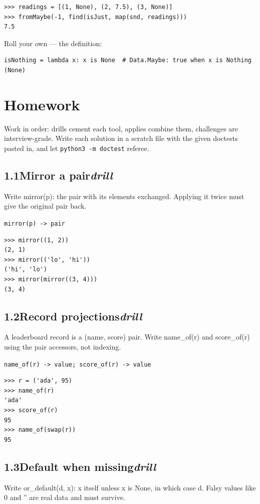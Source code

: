 \documentclass[10pt,letterpaper]{book}
\begin{document}
\begin{lstlisting}[style=ex]
>>> readings = [(1, None), (2, 7.5), (3, None)]
>>> fromMaybe(-1, find(isJust, map(snd, readings)))
7.5
\end{lstlisting}

Roll your own --- the definition:

\begin{lstlisting}[style=ex]
isNothing = lambda x: x is None  # Data.Maybe: true when x is Nothing (None)
\end{lstlisting}

\section{Homework}
Work in order: drills cement each tool, applies combine them,
challenges are interview-grade. Write each solution in a scratch file with
the given doctests pasted in, and let \texttt{python3 -m doctest} referee.
\subsection*{1.1\quad Mirror a pair\hfill\textnormal{\textit{drill}}}
Write mirror(p): the pair with its elements exchanged. Applying it twice must give the original pair back.

\noindent\texttt{mirror(p) -> pair}
\begin{lstlisting}[style=ex]
>>> mirror((1, 2))
(2, 1)
>>> mirror(('lo', 'hi'))
('hi', 'lo')
>>> mirror(mirror((3, 4)))
(3, 4)
\end{lstlisting}
\subsection*{1.2\quad Record projections\hfill\textnormal{\textit{drill}}}
A leaderboard record is a (name, score) pair. Write name\_of(r) and score\_of(r) using the pair accessors, not indexing.

\noindent\texttt{name\_of(r) -> value; score\_of(r) -> value}
\begin{lstlisting}[style=ex]
>>> r = ('ada', 95)
>>> name_of(r)
'ada'
>>> score_of(r)
95
>>> name_of(swap(r))
95
\end{lstlisting}
\subsection*{1.3\quad Default when missing\hfill\textnormal{\textit{drill}}}
Write or\_default(d, x): x itself unless x is None, in which case d. Falsy values like 0 and '' are real data and must survive.
\end{document}
